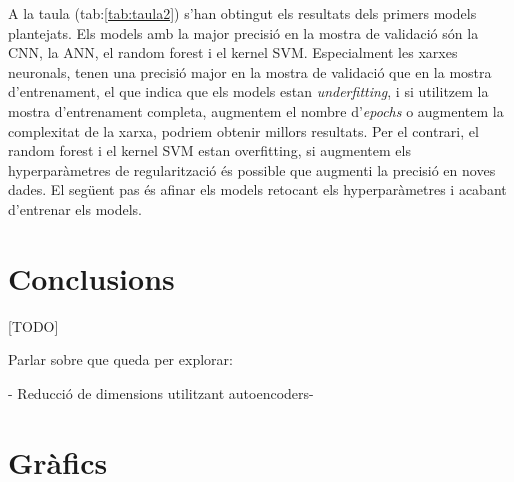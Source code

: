 \documentclass[12pt, spanish]{article}
\begin{document}
A la taula (tab:\ref{tab:taula2}) s'han obtingut els resultats dels primers models plantejats. Els models amb la major precisió en la mostra de validació són la CNN, la ANN, el random forest i el kernel SVM. Especialment les xarxes neuronals, tenen una precisió major en la mostra de validació que en la mostra d'entrenament, el que indica que els models estan \textit{underfitting}, i si utilitzem la mostra d'entrenament completa, augmentem el nombre d'\textit{epochs} o augmentem la complexitat de la xarxa, podriem obtenir millors resultats. Per el contrari, el random forest i el kernel SVM estan overfitting, si augmentem els hyperparàmetres de regularització és possible que augmenti la precisió en noves dades. El següent pas és afinar els models retocant els hyperparàmetres i acabant d'entrenar els models.






\section{Conclusions}

[TODO]

Parlar sobre que queda per explorar:

- Reducció de dimensions utilitzant autoencoders-

\clearpage
\appendix \label{sec:A}
\section{Gràfics}
\end{document}

